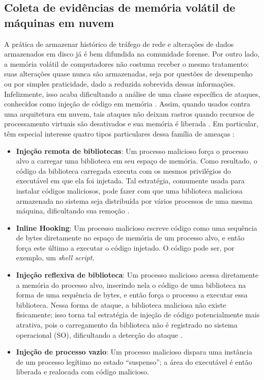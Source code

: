 \subsection{Coleta de evidências de memória volátil de máquinas em nuvem}
\label{sec:forensenuvem}

A prática de armazenar histórico de tráfego de rede e alterações de dados armazenados em disco já é bem difundida na comunidade forense.
%
Por outro lado, a memória volátil de computadores não costuma receber o mesmo tratamento: suas alterações quase nunca são armazenadas, seja por questões de desempenho ou por simples praticidade, dado a reduzida sobrevida dessas informações.
%
Infelizmente, isso acaba dificultando a análise de uma classe específica de ataques, conhecidos como injeção de código em memória \cite{CaseMemoryForensics:2014}. 
%
Assim, quando usados contra uma arquitetura em nuvem, tais ataques não deixam rastros quando recursos de processamento virtuais são desativados e sua memória é liberada \cite{VomelMemoryAcquisition:2013,CaseMemoryForensics:2014}.
%
Em particular, têm especial interesse quatro tipos particulares dessa família de ameaças \cite{CaseMemoryForensics:2014}:


\begin{itemize}
 \item \textbf{Injeção remota de bibliotecas}: Um processo malicioso força o processo alvo a carregar uma biblioteca em seu espaço de memória.
 Como resultado, o código da biblioteca carregada executa com os mesmos privilégios do executável em que ela foi injetada. 
 Tal estratégia, comumente usada para instalar códigos maliciosos, pode fazer com que uma biblioteca maliciosa armazenada no sistema seja distribuída por vários processos de uma mesma máquina, dificultando sua remoção \cite{MillerRemoteLibraryInjection:2004}.
 
 \item \textbf{Inline Hooking}: Um processo malicioso escreve código como uma sequência de bytes diretamente no espaço de memória de um processo alvo, e então força este último a executar o código injetado. 
 O código pode ser, por exemplo, um \textit{shell script}.
 

 \item \textbf{Injeção reflexiva de biblioteca}: Um processo malicioso acessa diretamente a memória do processo alvo, inserindo nela o código de uma biblioteca na forma de uma sequência de bytes, e então força o processo a executar essa biblioteca. 
 Nessa forma de ataque, a biblioteca maliciosa não existe fisicamente; isso torna tal estratégia de injeção de código potencialmente mais atrativa, pois o carregamento da biblioteca não é registrado no sistema operacional (SO), dificultando a detecção do ataque \cite{FewerReflectiveLibraryInject:2008}.
 
 \item \textbf{Injeção de processo vazio}: Um processo malicioso dispara uma instância de um processo legítimo no estado ``suspenso''; a área do executável é então liberada e realocada com código malicioso.
\end{itemize}


